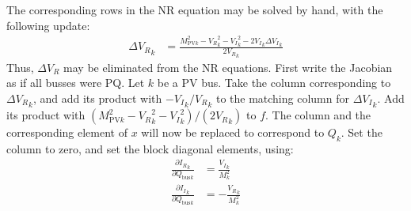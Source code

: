 \documentclass[11pt]{article}
\newcommand{\re}[1]{{{#1}_R}}
\newcommand{\im}[1]{{{#1}_I}}
\begin{document}
The corresponding rows in the NR equation may be solved by hand, with the following update:
\begin{align}
\re{\Delta V}_k &= \frac{M^2_{\text{PV}k} - \re{V}_k^2 - \im{V}_k^2- 2\im{V}_k\im{\Delta V}_k}{2\re{V}_k}
\end{align}
Thus, $\re{\Delta V}$ may be eliminated from the NR equations.  First write the Jacobian as if all busses were PQ. Let $k$ be a PV bus. Take the column corresponding to $\re{\Delta V}_k$, and add its product with $-\im{V}_k/\re{V}_k$ to the matching column for  $\im{\Delta V}_k$. Add its product with $(M^2_{\text{PV}k} - \re{V}_k^2 - \im{V}_k^2)/(2\re{V}_k)$ to $f$. The column and the corresponding element of $x$ will now be replaced to correspond to $Q_k$. Set the column to zero, and set the block diagonal elements, using:
\begin{align}
\frac{\partial \re{I}_k}{\partial Q_{\text{bus}k}} &= \frac{\im{V}_k}{M_k^2} \\
\frac{\partial \im{I}_k}{\partial Q_{\text{bus}k}} &= -\frac{\re{V}_k}{M_k^2}
\end{align}
\end{document}
